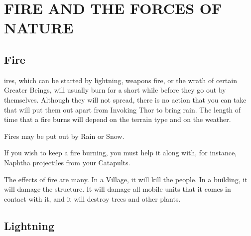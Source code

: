 
\chapter{\textsf{FIRE AND THE FORCES OF NATURE}}

\section{\textsf{Fire}}



ires, which can be started by lightning, weapons fire, or the wrath of certain Greater Beings, will usually burn for a short while before they go out by themselves. Although they will not spread, there is no action that you can take that will put them out apart from Invoking Thor to bring rain. The length of time that a fire burns will depend on the terrain type and on the weather.

Fires may be put out by Rain or Snow.


If you wish to keep a fire burning, you must help it along with, for instance, Naphtha projectiles from your Catapults.

The effects of fire are many. In a Village, it will kill the people. In a building, it will damage the structure. It will damage all mobile units that it comes in contact with it, and it will destroy trees and other plants.

\section{\textsf{Lightning}}

